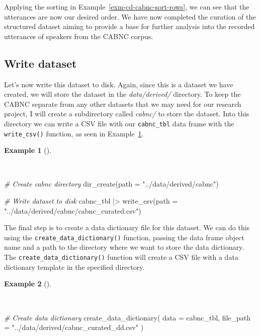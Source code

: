 \documentclass[
  letterpaper,
  DIV=11,
  numbers=noendperiod]{scrreport}
\newenvironment{Shaded}{\begin{snugshade}}{\end{snugshade}}
\newcommand{\AttributeTok}[1]{\textcolor[rgb]{0.00,0.00,0.00}{#1}}
\newcommand{\CommentTok}[1]{\textcolor[rgb]{0.00,0.00,0.00}{\textit{#1}}}
\newcommand{\FunctionTok}[1]{\textcolor[rgb]{0.00,0.00,0.00}{#1}}
\newcommand{\NormalTok}[1]{\textcolor[rgb]{0.00,0.00,0.00}{#1}}
\newcommand{\SpecialCharTok}[1]{\textcolor[rgb]{0.00,0.00,0.00}{#1}}
\newcommand{\StringTok}[1]{\textcolor[rgb]{0.00,0.00,0.00}{#1}}
\theoremstyle{definition}
\newtheorem{example}{Example}[chapter]
\theoremstyle{remark}
\begin{document}
Applying the sorting in Example~\ref{exm-cd-cabnc-sort-rows}, we can see
that the utterances are now our desired order. We have now completed the
curation of the structured dataset aiming to provide a base for further
analysis into the recorded utterances of speakers from the CABNC corpus.

\hypertarget{write-dataset-1}{%
\subsection{Write dataset}\label{write-dataset-1}}

Let's now write this dataset to disk. Again, since this is a dataset we
have created, we will store the dataset in the \emph{data/derived/}
directory. To keep the CABNC separate from any other datasets that we
may need for our research project, I will create a subdirectory called
\emph{cabnc/} to store the dataset. Into this directory we can write a
CSV file with our \texttt{cabnc\_tbl} data frame with the
\texttt{write\_csv()} function, as seen in
Example~\ref{exm-cd-cabnc-write-csv}.

\begin{example}[]\protect\hypertarget{exm-cd-cabnc-write-csv}{}\label{exm-cd-cabnc-write-csv}

~

\begin{Shaded}
\begin{Highlighting}[]
\CommentTok{\# Create cabnc directory}
\FunctionTok{dir\_create}\NormalTok{(}\AttributeTok{path =} \StringTok{"../data/derived/cabnc"}\NormalTok{)}

\CommentTok{\# Write dataset to disk}
\NormalTok{cabnc\_tbl }\SpecialCharTok{|\textgreater{}} 
  \FunctionTok{write\_csv}\NormalTok{(}\AttributeTok{path =} \StringTok{"../data/derived/cabnc/cabnc\_curated.csv"}\NormalTok{)}
\end{Highlighting}
\end{Shaded}

\end{example}

The final step is to create a data dictionary file for this dataset. We
can do this using the \texttt{create\_data\_dictionary()} function,
passing the data frame object name and a path to the directory where we
want to store the data dictionary. The
\texttt{create\_data\_dictionary()} function will create a CSV file with
a data dictionary template in the specified directory.

\begin{example}[]\protect\hypertarget{exm-cd-cabnc-create-data-dict}{}\label{exm-cd-cabnc-create-data-dict}

~

\begin{Shaded}
\begin{Highlighting}[]
\CommentTok{\# Create data dictionary}
\FunctionTok{create\_data\_dictionary}\NormalTok{(}
  \AttributeTok{data =}\NormalTok{ cabnc\_tbl,}
  \AttributeTok{file\_path =} \StringTok{"../data/derived/cabnc\_curated\_dd.csv"}
\NormalTok{)}
\end{Highlighting}
\end{Shaded}

\end{example}
\end{document}
